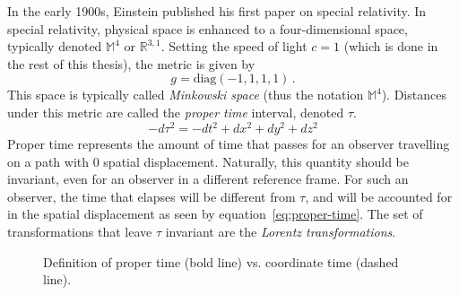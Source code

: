 In the early 1900s, Einstein published his first paper on special relativity. In special relativity, physical space is enhanced to a four-dimensional space, typically denoted $\mathbb{M}^4$ or $\mathbb{R}^{3,1}$. Setting the speed of light $c=1$ (which is done in the rest of this thesis), the metric is given by
\begin{equation}
    g = \mathrm{diag}(-1,1,1,1)\,.
\end{equation}
This space is typically called \textit{Minkowski space} (thus the notation $\mathbb{M}^4$). Distances under this metric are called the \textit{proper time} interval, denoted $\tau$.
\begin{equation}\label{eq:proper-time}
    -d\tau^2 = -dt^2 + dx^2 + dy^2 + dz^2
\end{equation}
Proper time represents the amount of time that passes for an observer travelling on a path with 0 spatial displacement. Naturally, this quantity should be invariant, even for an observer in a different reference frame. For such an observer, the time that elapses will be different from $\tau$, and will be accounted for in the spatial displacement as seen by equation~\ref{eq:proper-time}. The set of transformations that leave $\tau$ invariant are the \textit{Lorentz transformations}.
\begin{figure}
    \centering
    \caption{Definition of proper time (bold line) vs. coordinate time (dashed line).}
\end{figure}

